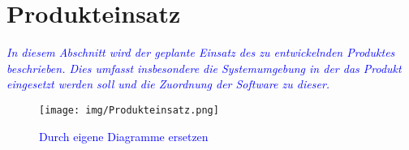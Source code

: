 \section{Produkteinsatz}
\textcolor{blue}{\textit{In diesem Abschnitt wird der geplante Einsatz des zu entwickelnden Produktes beschrieben. Dies umfasst insbesondere die Systemumgebung in der das Produkt eingesetzt werden soll und die Zuordnung der Software zu dieser.
}}

\begin{figure}[H]
\centering
\texttt{[image: img/Produkteinsatz.png]}
\caption{\textcolor{blue}{Durch eigene Diagramme ersetzen}}
\label{Produkteinsatz}
\end{figure}
